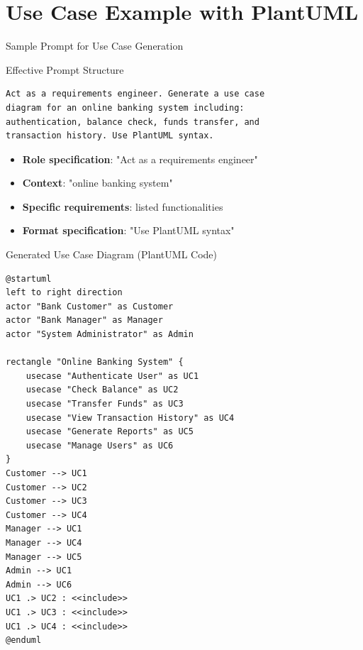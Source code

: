 \documentclass{beamer}
\begin{document}
\section{Use Case Example with PlantUML}

\begin{frame}[fragile]{Sample Prompt for Use Case Generation}
    \begin{block}{Effective Prompt Structure}
        \lstset{style=code}
        \begin{lstlisting}
Act as a requirements engineer. Generate a use case 
diagram for an online banking system including: 
authentication, balance check, funds transfer, and 
transaction history. Use PlantUML syntax.
        \end{lstlisting}
    \end{block}
    
    \begin{itemize}
        \item \textbf{Role specification}: "Act as a requirements engineer"
        \item \textbf{Context}: "online banking system"
        \item \textbf{Specific requirements}: listed functionalities
        \item \textbf{Format specification}: "Use PlantUML syntax"
    \end{itemize}
\end{frame}

\begin{frame}[fragile]{Generated Use Case Diagram (PlantUML Code)}
    \lstset{style=plantuml}
    \begin{lstlisting}[caption={Online Banking System Use Case Diagram}, label={lst:usecase}]
@startuml
left to right direction
actor "Bank Customer" as Customer
actor "Bank Manager" as Manager
actor "System Administrator" as Admin

rectangle "Online Banking System" {
    usecase "Authenticate User" as UC1
    usecase "Check Balance" as UC2
    usecase "Transfer Funds" as UC3
    usecase "View Transaction History" as UC4
    usecase "Generate Reports" as UC5
    usecase "Manage Users" as UC6
}
Customer --> UC1
Customer --> UC2
Customer --> UC3
Customer --> UC4
Manager --> UC1
Manager --> UC4
Manager --> UC5
Admin --> UC1
Admin --> UC6
UC1 .> UC2 : <<include>>
UC1 .> UC3 : <<include>>
UC1 .> UC4 : <<include>>
@enduml
    \end{lstlisting}
\end{frame}
\end{document}
